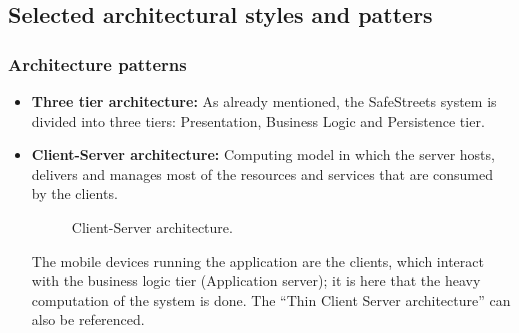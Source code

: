 \subsection{Selected architectural styles and patters}

\subsubsection{Architecture patterns}
\begin{itemize}
    \item 
    \textbf{Three tier architecture:} As already mentioned, the SafeStreets system is divided into three tiers: Presentation, Business Logic and Persistence tier.
    \item
    \textbf{Client-Server architecture:} Computing model in which the server hosts, delivers and manages most of the resources and services that are consumed by the clients.

    \begin{figure}[H]
    \centering
    \caption{\label{fig:client-server}Client-Server architecture.}
    \end{figure}

    The mobile devices running the application are the clients, which interact with the business logic tier (Application server); it is here that the heavy computation of the system is done. The “Thin Client Server architecture” can also be referenced.
\end{itemize}


